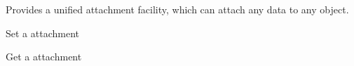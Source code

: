 
Provides a unified attachment facility, which can attach any data to any object.



\begin{example}{Set a attachment}
\end{example}

\begin{example}{Get a attachment}
\end{example}